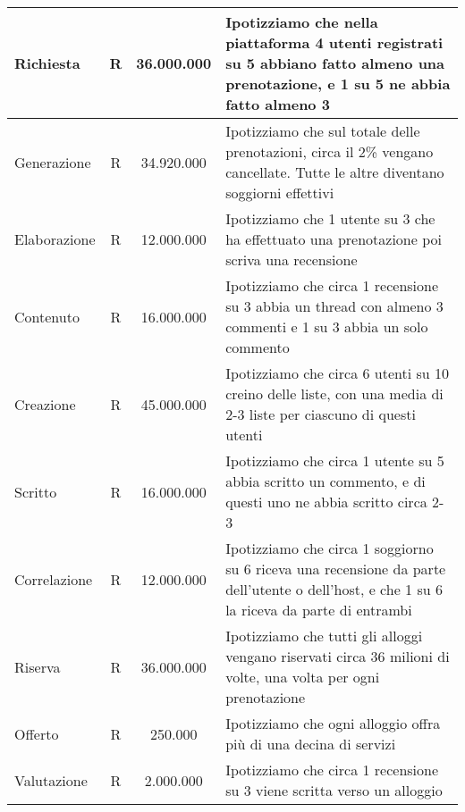 \begin{longtable}{|l|c|c|p{6.2cm}|}
    Richiesta                & R             & 36.000.000      & {Ipotizziamo che nella piattaforma 4 utenti registrati su 5 abbiano fatto almeno una prenotazione, e 1 su 5 ne abbia fatto almeno 3}                                                    \\\hline
    Generazione              & R             & 34.920.000      & {Ipotizziamo che sul totale delle prenotazioni, circa il 2\% vengano cancellate. Tutte le altre diventano soggiorni effettivi}                                                        \\\hline
    Elaborazione             & R             & 12.000.000      & {Ipotizziamo che 1 utente su 3 che ha effettuato una prenotazione poi scriva una recensione}                                                                 \\\hline
    Contenuto                & R             & 16.000.000      & {Ipotizziamo che circa 1 recensione su 3 abbia un thread con almeno 3 commenti e 1 su 3 abbia un solo commento}                                                                   \\\hline
    Creazione                & R             & 45.000.000      & {Ipotizziamo che circa 6 utenti su 10 creino delle liste, con una media di 2-3 liste per ciascuno di questi utenti}                                                                     \\\hline
    Scritto                  & R             & 16.000.000      & {Ipotizziamo che circa 1 utente su 5 abbia scritto un commento, e di questi uno ne abbia scritto circa 2-3}                                                                        \\\hline
    Correlazione             & R             & 12.000.000      & {Ipotizziamo che circa 1 soggiorno su 6 riceva una recensione da parte dell'utente o dell'host, e che 1 su 6 la riceva da parte di entrambi}                                           \\\hline
    Riserva                  & R             & 36.000.000      & {Ipotizziamo che tutti gli alloggi vengano riservati circa 36 milioni di volte, una volta per ogni prenotazione}                                                               \\\hline
    Offerto                  & R             & 250.000         & {Ipotizziamo che ogni alloggio offra più di una decina di servizi}                                                                    \\\hline
    Valutazione              & R             & 2.000.000       & {Ipotizziamo che circa 1 recensione su 3 viene scritta verso un alloggio}                                                                   \\\hline
\end{longtable}

